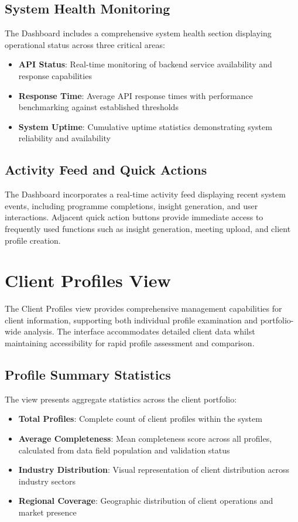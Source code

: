 \documentclass{article}
\begin{document}
\subsection{System Health Monitoring}
The Dashboard includes a comprehensive system health section displaying operational status across three critical areas:

\begin{itemize}
    \item \textbf{API Status}: Real-time monitoring of backend service availability and response capabilities
    \item \textbf{Response Time}: Average API response times with performance benchmarking against established thresholds
    \item \textbf{System Uptime}: Cumulative uptime statistics demonstrating system reliability and availability
\end{itemize}

\subsection{Activity Feed and Quick Actions}
The Dashboard incorporates a real-time activity feed displaying recent system events, including programme completions, insight generation, and user interactions. Adjacent quick action buttons provide immediate access to frequently used functions such as insight generation, meeting upload, and client profile creation.

\section{Client Profiles View}
The Client Profiles view provides comprehensive management capabilities for client information, supporting both individual profile examination and portfolio-wide analysis. The interface accommodates detailed client data whilst maintaining accessibility for rapid profile assessment and comparison.

\subsection{Profile Summary Statistics}
The view presents aggregate statistics across the client portfolio:

\begin{itemize}
    \item \textbf{Total Profiles}: Complete count of client profiles within the system
    \item \textbf{Average Completeness}: Mean completeness score across all profiles, calculated from data field population and validation status
    \item \textbf{Industry Distribution}: Visual representation of client distribution across industry sectors
    \item \textbf{Regional Coverage}: Geographic distribution of client operations and market presence
\end{itemize}
\end{document}
